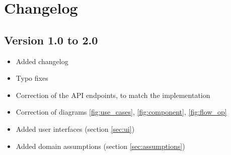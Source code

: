 \chapter{Changelog}
\section{Version 1.0 to 2.0}
\begin{itemize}
    \item Added changelog
    \item Typo fixes
    \item Correction of the API endpoints, to match the implementation
    \item Correction of diagrams \ref{fig:use_cases}, \ref{fig:component}, \ref{fig:flow_op}
    \item Added user interfaces (section \ref{sec:ui})
    \item Added domain assumptions (section \ref{sec:assumptions})
\end{itemize} 
